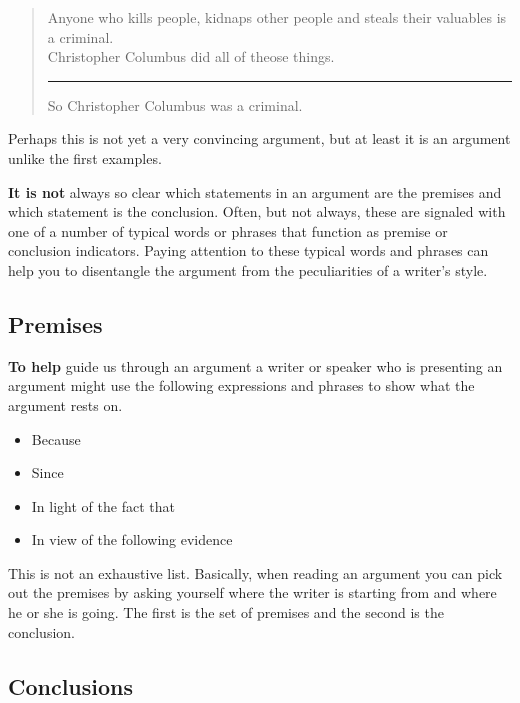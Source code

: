 \documentclass[]{book}
\makeatletter
\providecommand{\tightlist}{%
  \setlength{\itemsep}{0pt}\setlength{\parskip}{0pt}}
\newenvironment{kframe}{%
\medskip{}
\setlength{\fboxsep}{.8em}
 \def\at@end@of@kframe{}%
 \ifinner\ifhmode%
  \def\at@end@of@kframe{\end{minipage}}%
  \begin{minipage}{\columnwidth}%
 \fi\fi%
 \def\FrameCommand##1{\hskip\@totalleftmargin \hskip-\fboxsep
 \colorbox{shadecolor}{##1}\hskip-\fboxsep
     \hskip-\linewidth \hskip-\@totalleftmargin \hskip\columnwidth}%
 \MakeFramed {\advance\hsize-\width
   \@totalleftmargin\z@ \linewidth\hsize
   \@setminipage}}%
 {\par\unskip\endMakeFramed%
 \at@end@of@kframe}
\newenvironment{rmdblock}[1]
  {
  \begin{itemize}
  \renewcommand{\labelitemi}{
    \raisebox{-.7\height}[0pt][0pt]{
      {\setkeys{Gin}{width=3em,keepaspectratio}\texttt{[image: img/\#1]}}
    }
  }
  \setlength{\fboxsep}{1em}
  \begin{kframe}
  \item
  }
  {
  \end{kframe}
  \end{itemize}
  }
\newenvironment{rmdnote}
  {\begin{rmdblock}{note}}
  {\end{rmdblock}}
\newenvironment{argument}{\begin{quote}\normalsize}{\end{quote}}
\makeatother
\begin{document}
\begin{argument}
Anyone who kills people, kidnaps other people and steals their valuables
is a criminal.\\
Christopher Columbus did all of theose things.

\begin{center}\rule{0.5\linewidth}{\linethickness}\end{center}

So Christopher Columbus was a criminal.
\end{argument}

Perhaps this is not yet a very convincing argument, but at least it is an argument unlike the first examples.

\textbf{It is not} always so clear which statements in an argument are the premises and which statement is the conclusion. Often, but not always, these are signaled with one of a number of typical words or phrases that function as premise or conclusion indicators. Paying attention to these typical words and phrases can help you to disentangle the argument from the peculiarities of a writer's style.

\hypertarget{premises}{%
\subsection*{Premises}\label{premises}}


\textbf{To help} guide us through an argument a writer or speaker who is presenting an argument might use the following expressions and phrases to show what the argument rests on.

\begin{rmdnote}
\begin{itemize}
\tightlist
\item
  Because
\item
  Since
\item
  In light of the fact that
\item
  In view of the following evidence
\end{itemize}
\end{rmdnote}

This is not an exhaustive list. Basically, when reading an argument you can pick out the premises by asking yourself where the writer is starting from and where he or she is going. The first is the set of premises and the second is the conclusion.

\hypertarget{conclusions}{%
\subsection*{Conclusions}\label{conclusions}}
\end{document}
